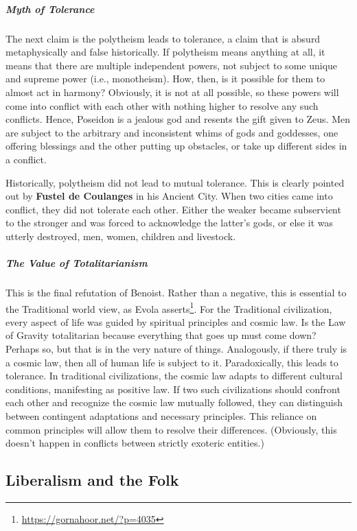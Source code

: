 \subparagraph{Myth of Tolerance}


The next claim is the polytheism leads to tolerance, a claim that is absurd metaphysically and false historically. If polytheism means anything at all, it means that there are multiple independent powers, not subject to some unique and supreme power (i.e., monotheism). How, then, is it possible for them to almost act in harmony? Obviously, it is not at all possible, so these powers will come into conflict with each other with nothing higher to resolve any such conflicts. Hence, Poseidon is a jealous god and resents the gift given to Zeus. Men are subject to the arbitrary and inconsistent whims of gods and goddesses, one offering blessings and the other putting up obstacles, or take up different sides in a conflict.

Historically, polytheism did not lead to mutual tolerance. This is clearly pointed out by \textbf{Fustel de Coulanges} in his Ancient City. When two cities came into conflict, they did not tolerate each other. Either the weaker became subservient to the stronger and was forced to acknowledge the latter's gods, or else it was utterly destroyed, men, women, children and livestock.

\subparagraph{The Value of Totalitarianism}

This is the final refutation of Benoist. Rather than a negative, this is essential to the Traditional world view, as Evola asserts\footnote{\url{https://gornahoor.net/?p=4035}}. For the Traditional civilization, every aspect of life was guided by spiritual principles and cosmic law. Is the Law of Gravity totalitarian because everything that goes up must come down? Perhaps so, but that is in the very nature of things. Analogously, if there truly is a cosmic law, then all of human life is subject to it. Paradoxically, this leads to tolerance. In traditional civilizations, the cosmic law adapts to different cultural conditions, manifesting as positive law. If two such civilizations should confront each other and recognize the cosmic law mutually followed, they can distinguish between contingent adaptations and necessary principles. This reliance on common principles will allow them to resolve their differences. (Obviously, this doesn't happen in conflicts between strictly exoteric entities.)

\subsection*{Liberalism and the Folk}

